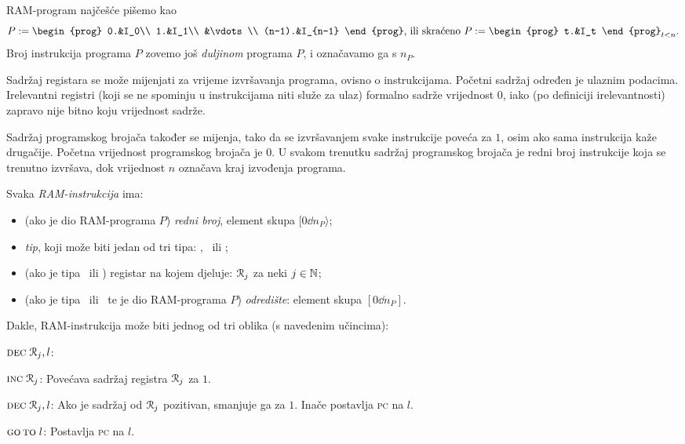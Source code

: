 RAM-program najčešće pišemo kao \begin{equation}
P:=\begin{prog}
    0.&I_0\\
    1.&I_1\\
    &\vdots\\
    (n-1).&I_{n-1}
    \end{prog}\text{, ili skraćeno } P:=\begin{prog}
    t.&I_t
    \end{prog}_{t<n}\text.
\end{equation}
Broj instrukcija programa $P$ zovemo još \emph{duljinom} programa $P$, i označavamo ga s $n_P$.

Sadržaj registara se može mijenjati za vrijeme izvršavanja programa, ovisno o instrukcijama. Početni sadržaj određen je ulaznim podacima. Irelevantni registri (koji se ne spominju u instrukcijama niti služe za ulaz) formalno sadrže vrijednost $0$, iako (po definiciji irelevantnosti) zapravo nije bitno koju vrijednost sadrže.

Sadržaj programskog brojača također se mijenja, tako da se iz\-vr\-ša\-va\-njem svake instrukcije poveća za $1$, osim ako sama instrukcija kaže drugačije. Početna vrijednost programskog brojača je $0$. U svakom trenutku sadržaj programskog brojača je redni broj instrukcije koja se trenutno izvršava, dok vrijednost $n$ označava kraj izvođenja programa.

\begin{definicija}[{name=[RAM-instrukcija]}]
Svaka \emph{RAM-instrukcija} ima:
\begin{itemize}
    \item (ako je dio RAM-programa $P$) \emph{redni broj}, element skupa $[0\dd n_P\rangle$;
    \item \emph{tip}, koji može biti jedan od tri tipa: \inc, \dec\ ili \goto;
    \item (ako je tipa \inc\ ili \dec) registar na kojem djeluje: $\mathcal R_{j}$ za neki $j\in{\mathbb N}$;
    \item (ako je tipa \dec\ ili \goto\ te je dio RAM-programa $P$) \emph{odredište}: element skupa $[0\dd n_P]$.
    \qedhere
\end{itemize}
\end{definicija}

Dakle, RAM-instrukcija može biti jednog od tri oblika (s navedenim učincima):
\begin{labeling}{$\textsc{dec}\;\mathcal R_{j},l$:}
    \item[$\textsc{inc}\;\mathcal R_{j}$:] Povećava sadržaj registra $\mathcal R_{j}$ za $1$.
    \item[$\textsc{dec}\;\mathcal R_{j},l$:] Ako je sadržaj od $\mathcal R_{j}$ pozitivan, smanjuje ga za $1$. Inače postavlja \textsc{pc} na $l$.
    \item[$\textsc{go\,to}\;l$:] Postavlja \textsc{pc} na $l$.
\end{labeling}

